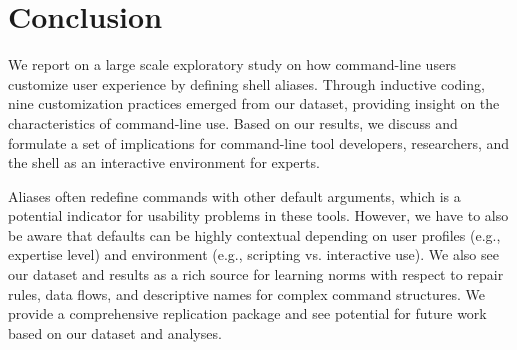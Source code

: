\section{Conclusion}

We report on a large scale exploratory study on how command-line users customize user experience by defining shell aliases.
Through inductive coding, nine customization practices emerged from our dataset, providing insight on the characteristics of command-line use.
Based on our results, we discuss and formulate a set of implications for command-line tool developers, researchers, and the shell as an interactive environment for experts.

Aliases often redefine commands with other default arguments, which is a potential indicator for usability problems in these tools.
However, we have to also be aware that defaults can be highly contextual depending on user profiles (e.g., expertise level) and environment (e.g., scripting vs. interactive use).
We also see our dataset and results as a rich source for learning norms with respect to repair rules, data flows, and descriptive names for complex command structures.
We provide a comprehensive replication package and see potential for future work based on our dataset and analyses.